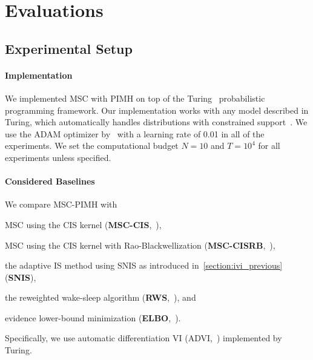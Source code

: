 

\vspace{-0.05in}
\section{Evaluations}\label{section:eval}
\subsection{Experimental Setup}
\paragraph{Implementation}
We implemented MSC with PIMH on top of the Turing~\citep{ge2018t} probabilistic programming framework.
Our implementation works with any model described in Turing, which automatically handles distributions with constrained support~\citep{JMLR:v18:16-107}.
We use the ADAM optimizer by~\citet{kingma_adam_2015} with a learning rate of 0.01 in all of the experiments.
We set the computational budget \(N=10\) and \(T=10^4\) for all experiments unless specified.

\vspace{-0.1in}
\paragraph{Considered Baselines}
We compare MSC-PIMH with
\begin{enumerate*}[label=\textbf{(\roman*)}]
  \item MSC using the CIS kernel (\textbf{MSC-CIS},~\citealt{NEURIPS2020_b2070693}), 
  \item MSC using the CIS kernel with Rao-Blackwellization (\textbf{MSC-CISRB},~\citealt{NEURIPS2020_b2070693}),
  \item the adaptive IS method using SNIS as introduced in~\cref{section:ivi_previous} (\textbf{SNIS}),
  \item the reweighted wake-sleep algorithm (\textbf{RWS},~\citealt{DBLP:journals/corr/BornscheinB14}), and  
  \item evidence lower-bound minimization (\textbf{ELBO},~\citealt{pmlr-v33-ranganath14}).
\end{enumerate*}
Specifically, we use automatic differentiation VI (ADVI,~\citealt{JMLR:v18:16-107}) implemented by Turing.


